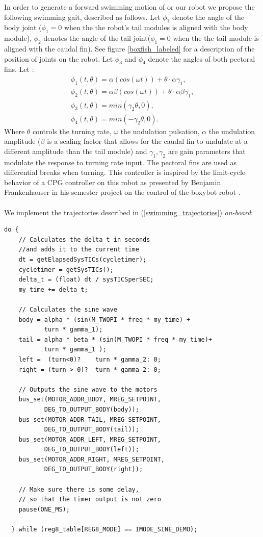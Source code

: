 \documentclass[11pt]{article}
\begin{document}
In order to generate a forward swimming motion of or our robot we propose the following swimming gait, described as follows. Let $\phi_1$ denote the angle of the body joint ($\phi_1 = 0$ when the the robot's tail modules is aligned with the body module), $\phi_2$ denotes the angle of the tail joint($\phi_1 = 0$ when the the tail module is aligned with the caudal fin). See figure \ref{boxfish_labeled} for a description of the position of joints on the robot. Let $\phi_3$ and $\phi_4$ denote the angles of both pectoral fins. Let : 
\begin{equation}
\label{swimming_trajectories}
\begin{aligned}
    \phi_1(t, \theta) = \alpha \left( cos(\omega t) \right) + \theta \cdot \alpha \gamma_1, \\
    \phi_2(t, \theta) = \alpha \beta \left( cos(\omega t) \right) + \theta \cdot \alpha \beta \gamma_1, \\
    \phi_3(t, \theta) = min(\gamma_2 \theta, 0),\\
    \phi_4(t, \theta) = min(-\gamma_2 \theta, 0).
\end{aligned}
\end{equation}
Where $\theta$ controls the turning rate, $\omega$ the undulation pulsation, $\alpha$ the undulation amplitude ($\beta$ is a scaling factor that allows for the caudal fin to undulate at a different amplitude than the tail module) and $\gamma_1, \gamma_2$ are gain parameters that modulate the response to turning rate input. The pectoral fins are used as differential breaks when turning. This controller is inspired by the limit-cycle behavior of a CPG controller on this robot as presented by Benjamin Frankenhauser in his semester project on the control of the boxybot robot \cite{boxybot_2}. 
\\
\\
We implement the trajectories described in (\ref{swimming_trajectories}) \textit{on-board}: 

\begin{verbatim}
do {
    // Calculates the delta_t in seconds 
    //and adds it to the current time
    dt = getElapsedSysTICs(cycletimer);
    cycletimer = getSysTICs();
    delta_t = (float) dt / sysTICSperSEC;
    my_time += delta_t;

    // Calculates the sine wave
    body = alpha * (sin(M_TWOPI * freq * my_time) + 
           turn * gamma_1);
    tail = alpha * beta * (sin(M_TWOPI * freq * my_time)+ 
           turn * gamma_1 );
    left =  (turn<0)?    turn * gamma_2: 0;
    right = (turn > 0)?  turn * gamma_2: 0;

    // Outputs the sine wave to the motors
    bus_set(MOTOR_ADDR_BODY, MREG_SETPOINT, 
           DEG_TO_OUTPUT_BODY(body));
    bus_set(MOTOR_ADDR_TAIL, MREG_SETPOINT, 
           DEG_TO_OUTPUT_BODY(tail));
    bus_set(MOTOR_ADDR_LEFT, MREG_SETPOINT, 
           DEG_TO_OUTPUT_BODY(left));
    bus_set(MOTOR_ADDR_RIGHT, MREG_SETPOINT, 
           DEG_TO_OUTPUT_BODY(right));

    // Make sure there is some delay, 
    // so that the timer output is not zero
    pause(ONE_MS);

  } while (reg8_table[REG8_MODE] == IMODE_SINE_DEMO);
\end{verbatim}
\end{document}
